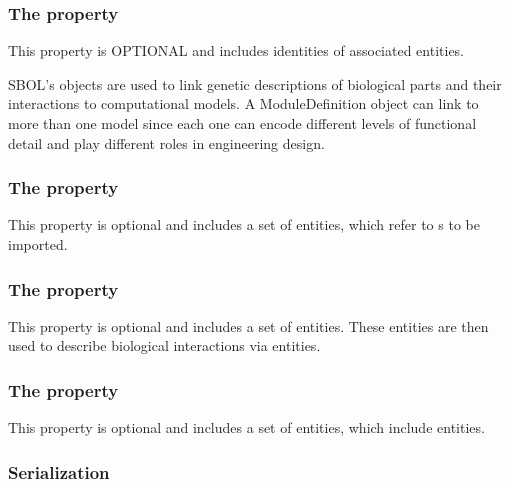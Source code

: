 \subsubsection*{The  property}
This property is OPTIONAL and includes identities of associated  entities.

SBOL's  objects are used to link genetic descriptions of biological parts and their interactions to computational models.
A ModuleDefinition object can link to more than one model since each one can encode different levels of functional detail and play different roles in engineering design. 


\subsubsection*{The  property}
This property is optional and includes a set of  entities, which refer to s to be imported.

\subsubsection*{The  property}
This property is optional and includes a set of  entities. These entities are then used to describe biological interactions via  entities.


\subsubsection*{The  property}
This property is optional and includes a set of  entities, which include  entities.

\subsubsection*{Serialization}

